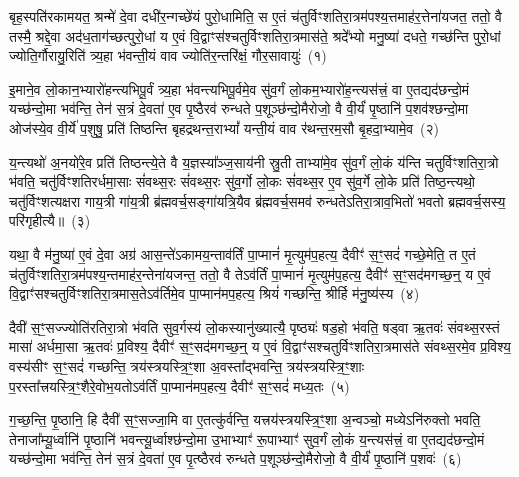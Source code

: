 \setcounter{anuvakam}{0}
बृह॒स्पति॑रकामयत॒ श्रन्मे॑ दे॒वा दधी॑र॒न्गच्छे॑यं पुरो॒धामिति॒ स ए॒तं च॑तुर्विꣳशतिरा॒त्रम॑पश्य॒त्तमाह॑र॒त्तेना॑यजत॒ ततो॒ वै तस्मै॒ श्रद्दे॒वा अद॑ध॒ताग॑च्छत्पुरो॒धां य ए॒वं वि॒द्वाꣳस॑श्चतुर्विꣳशतिरा॒त्रमास॑ते॒ श्रदे᳚भ्यो मनु॒ष्या॑ दधते॒ गच्छ॑न्ति पुरो॒धां ज्योति॒र्गौरायु॒रिति॑ त्र्य॒हा भ॑वन्ती॒यं वाव ज्योति॑र॒न्तरि॑क्षं॒ गौर॒सावायुः॑~(१)

इ॒माने॒व लो॒कान॒भ्यारो॑हन्त्यभिपू॒र्वं त्र्य॒हा भ॑वन्त्यभिपू॒र्वमे॒व सु॑व॒र्गं लो॒कम॒भ्यारो॑ह॒न्त्यस॑त्त्रं॒ वा ए॒तद्यद॑छन्दो॒मं यच्छ॑न्दो॒मा भव॑न्ति॒ तेन॑ स॒त्रं दे॒वता॑ ए॒व पृ॒ष्ठैरव॑ रुन्धते प॒शूञ्छ॑न्दो॒मैरोजो॒ वै वी॒र्यं॑ पृ॒ष्ठानि॑ प॒शव॑श्छन्दो॒मा ओज॑स्ये॒व वी॒र्ये॑ प॒शुषु॒ प्रति॑ तिष्ठन्ति बृहद्रथन्त॒रा\-भ्यां᳚ यन्ती॒यं वाव र॑थन्त॒रम॒सौ बृ॒हदा॒भ्यामे॒व~(२)

य॒न्त्यथो॑ अ॒नयो॑रे॒व प्रति॑ तिष्ठन्त्ये॒ते वै य॒ज्ञस्या᳚ञ्ज॒साय॑नी स्रु॒ती ताभ्या॑मे॒व सु॑व॒र्गं लो॒कं य॑न्ति चतुर्विꣳशतिरा॒त्रो भ॑वति॒ चतु॑र्विꣳशतिरर्धमा॒साः सं॑वथ्स॒रः सं॑वथ्स॒रः सु॑व॒र्गो लो॒कः सं॑वथ्स॒र ए॒व सु॑व॒र्गे लो॒के प्रति॑ तिष्ठ॒न्त्यथो॒ चतु॑र्विꣳशत्यक्षरा गाय॒त्री गा॑य॒त्री ब्र॑ह्मवर्च॒सङ्गा॑यत्रि॒यैव ब्र॑ह्मवर्च॒समव॑ रुन्धते\-ऽतिरा॒त्राव॒भितो॑ भवतो ब्रह्मवर्च॒सस्य॒ परि॑गृहीत्यै॥~(३)

{\anuvakamend[{अ॒सावायु॑रा॒भ्यामे॒व पञ्च॑चत्वारिꣳशच्च}]}%

यथा॒ वै म॑नु॒ष्या॑ ए॒वं दे॒वा अग्र॑ आस॒न्ते॑\-ऽकामय॒न्ताव॑र्तिं पा॒प्मानं॑ मृ॒त्युम॑प॒हत्य॒ दैवीꣳ॑ स॒ꣳ॒सदं॑ गच्छे॒मेति॒ त ए॒तं च॑तुर्विꣳशतिरा॒त्रम॑पश्य॒न्तमाह॑र॒न्तेना॑यजन्त॒ ततो॒ वै ते\-ऽव॑र्तिं पा॒प्मानं॑ मृ॒त्युम॑प॒हत्य॒ दैवीꣳ॑ स॒ꣳ॒सद॑मगच्छ॒न्॒ य ए॒वं वि॒द्वाꣳ॑सश्चतुर्विꣳशतिरा॒त्रमास॒ते\-ऽव॑र्तिमे॒व पा॒प्मान॑मप॒हत्य॒ श्रियं॑ गच्छन्ति॒ श्रीर्\mbox{}हि म॑नु॒ष्य॑स्य~(४)

दैवी॑ स॒ꣳ॒सज्ज्योति॑रतिरा॒त्रो भ॑वति सुव॒र्गस्य॑ लो॒कस्यानु॑ख्यात्यै॒ पृष्ठ्यः॑ षड॒हो भ॑वति॒ षड्वा ऋ॒तवः॑ संवथ्स॒रस्तं मासा॑ अर्धमा॒सा ऋ॒तवः॑ प्र॒विश्य॒ दैवीꣳ॑ स॒ꣳ॒सद॑मगच्छ॒न्॒ य ए॒वं वि॒द्वाꣳ॑सश्चतुर्विꣳशतिरा॒त्रमास॑ते संवथ्स॒रमे॒व प्र॒विश्य॒ वस्य॑सीꣳ स॒ꣳ॒सदं॑ गच्छन्ति॒ त्रय॑स्त्रयस्त्रि॒ꣳ॒शा अ॒वस्ता᳚द्भवन्ति॒ त्रय॑स्त्रयस्त्रि॒ꣳ॒शाः प॒रस्ता᳚त्त्रयस्त्रि॒ꣳ॒शैरे॒वोभ॒यतो\-ऽव॑र्तिं पा॒प्मान॑मप॒हत्य॒ दैवीꣳ॑ स॒ꣳ॒सदं॑ मध्य॒तः~(५)

ग॒च्छ॒न्ति॒ पृ॒ष्ठानि॒ हि दैवी॑ स॒ꣳ॒सज्जा॒मि वा ए॒तत्कु॑र्वन्ति॒ यत्त्रय॑स्त्रयस्त्रि॒ꣳ॒शा अ॒न्वञ्चो॒ मध्ये\-ऽनि॑रुक्तो भवति॒ तेनाजा᳚म्यू॒र्ध्वानि॑ पृ॒ष्ठानि॑ भवन्त्यू॒र्ध्वाश्छ॑न्दो॒मा उ॒भाभ्याꣳ॑ रू॒पाभ्याꣳ॑ सुव॒र्गं लो॒कं य॒न्त्यस॑त्त्रं॒ वा ए॒तद्यद॑छन्दो॒मं यच्छ॑न्दो॒मा भव॑न्ति॒ तेन॑ स॒त्रं दे॒वता॑ ए॒व पृ॒त्ष्ठैरव॑ रुन्धते प॒शूञ्छ॑न्दो॒मैरोजो॒ वै वी॒र्यं॑ पृ॒ष्ठानि॑ प॒शवः॑~(६)

